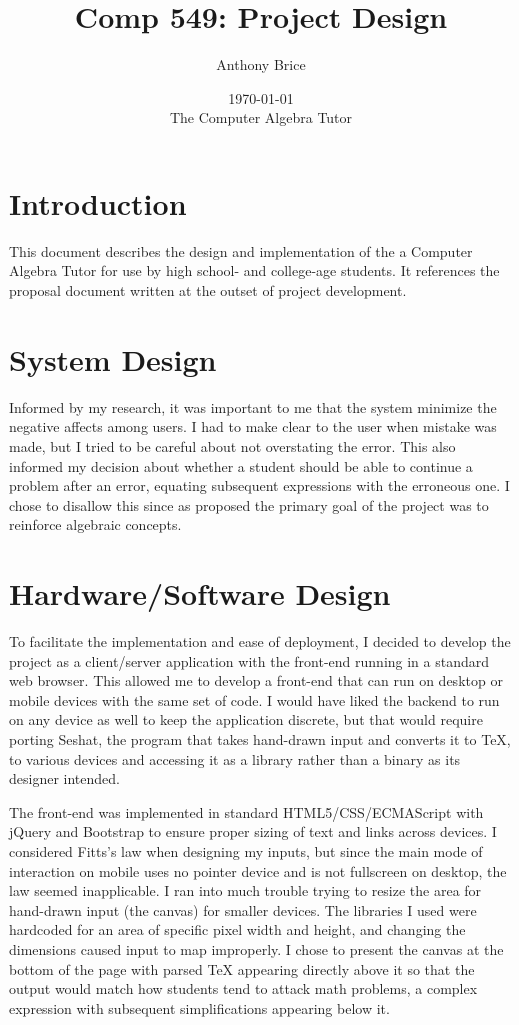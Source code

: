 \documentclass{abrice}
\title{Comp 549: Project Design}
\author{Anthony Brice}
\date{\today\protect\\ \bigskip The Computer Algebra Tutor}
\begin{document}
\maketitle

\section{Introduction}

This document describes the design and implementation of the a Computer Algebra
Tutor for use by high school- and college-age students. It references the
proposal document written at the outset of project development.

\section{System Design}

Informed by my research, it was important to me that the system minimize the
negative affects among users. I had to make clear to the user when mistake was
made, but I tried to be careful about not overstating the error. This also
informed my decision about whether a student should be able to continue a
problem after an error, equating subsequent expressions with the erroneous
one. I chose to disallow this since as proposed the primary goal of the project
was to reinforce algebraic concepts.

\section{Hardware/Software Design}

To facilitate the implementation and ease of deployment, I decided to develop
the project as a client/server application with the front-end running in a
standard web browser. This allowed me to develop a front-end that can run on
desktop or mobile devices with the same set of code. I would have liked the
backend to run on any device as well to keep the application discrete, but that
would require porting Seshat, the program that takes hand-drawn input and
converts it to \TeX, to various devices and accessing it as a library rather than
a binary as its designer intended.

The front-end was implemented in standard HTML5/CSS/ECMAScript with jQuery and
Bootstrap to ensure proper sizing of text and links across devices. I considered
Fitts's law when designing my inputs, but since the main mode of interaction on
mobile uses no pointer device and is not fullscreen on desktop, the law seemed
inapplicable. I ran into much trouble trying to resize the area for hand-drawn
input (the canvas) for smaller devices. The libraries I used were hardcoded for
an area of specific pixel width and height, and changing the dimensions caused
input to map improperly. I chose to present the canvas at the bottom of the page
with parsed TeX appearing directly above it so that the output would match how
students tend to attack math problems, a complex expression with subsequent
simplifications appearing below it.
\end{document}
